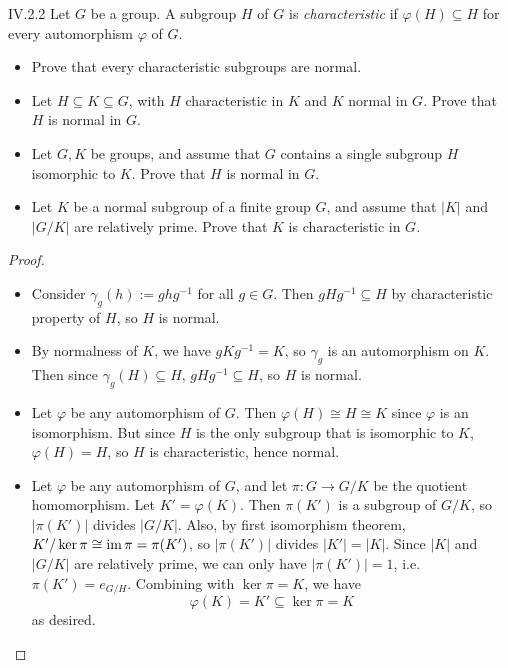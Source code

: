 \begin{problem}{IV.2.2}
Let $G$ be a group. A subgroup $H$ of $G$ is \emph{characteristic} if $\varphi(H) \subseteq H$ for every automorphism $\varphi$ of $G$.
\begin{itemize}
\setlength\itemsep{0pc}
\item Prove that every characteristic subgroups are normal.
\item Let $H \subseteq K \subseteq G$, with $H$ characteristic in $K$ and $K$ normal in $G$. Prove that $H$ is normal in $G$. 
\item Let $G,K$ be groups, and assume that $G$ contains a single subgroup $H$ isomorphic to $K$. Prove that $H$ is normal in $G$.
\item Let $K$ be a normal subgroup of a finite group $G$, and assume that $|K|$ and $|G/K|$ are relatively prime. Prove that $K$ is characteristic in $G$.
\end{itemize} 
\end{problem}
\begin{proof}\
\begin{itemize}
\setlength\itemsep{0pt}
\item Consider $\gamma_g(h) := ghg^{-1}$ for all $g \in G$. Then $gHg^{-1} \subseteq H$ by characteristic property of $H$, so $H$ is normal.
\item By normalness of $K$, we have $gKg^{-1} = K$, so $\gamma_g$ is an automorphism on $K$. Then since $\gamma_g(H) \subseteq H$, $gHg^{-1} \subseteq H$, so $H$ is normal.
\item Let $\varphi$ be any automorphism of $G$. Then $\varphi(H) \cong H \cong K$ since $\varphi$ is an isomorphism. But since $H$ is the only subgroup that is isomorphic to $K$, $\varphi(H) = H$, so $H$ is characteristic, hence normal. 
\item Let $\varphi$ be any automorphism of $G$, and let $\pi : G \to G/K$ be the quotient homomorphism.	Let $K' = \varphi(K)$. Then $\pi(K')$ is a subgroup of $G/K$, so $|\pi(K')|$ divides $|G/K|$. Also, by first isomorphism theorem, $K'/\ker \pi \cong \operatorname{im} \pi = \pi(K')$, so $|\pi(K')|$ divides $|K'| = |K|$. Since $|K|$ and $|G/K|$ are relatively prime, we can only have $|\pi(K')| = 1$, i.e. $\pi(K') = e_{G/H}$. Combining with $\ker \pi = K$, we have
\[
\varphi(K) = K' \subseteq \ker \pi = K
\]
as desired.
\end{itemize}
\end{proof}

